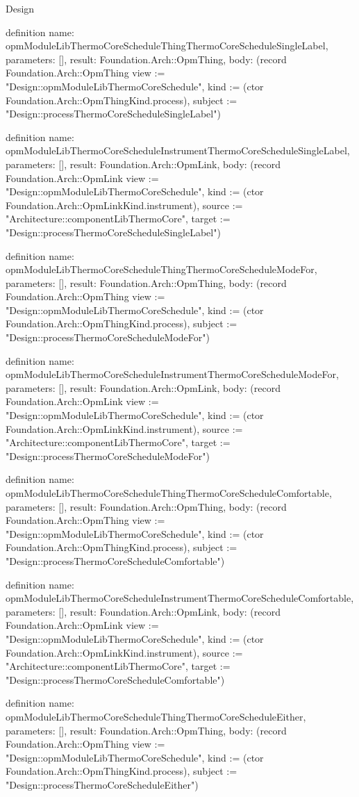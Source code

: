 \begin{lexlean}{Design}
\begin{semanticmodule}
definition{
  name: opmModuleLibThermoCoreScheduleThingThermoCoreScheduleSingleLabel,
  parameters: [],
  result: Foundation.Arch::OpmThing,
  body: (record Foundation.Arch::OpmThing {view := "Design::opmModuleLibThermoCoreSchedule", kind := (ctor Foundation.Arch::OpmThingKind.process), subject := "Design::processThermoCoreScheduleSingleLabel"})
}

definition{
  name: opmModuleLibThermoCoreScheduleInstrumentThermoCoreScheduleSingleLabel,
  parameters: [],
  result: Foundation.Arch::OpmLink,
  body: (record Foundation.Arch::OpmLink {view := "Design::opmModuleLibThermoCoreSchedule", kind := (ctor Foundation.Arch::OpmLinkKind.instrument), source := "Architecture::componentLibThermoCore", target := "Design::processThermoCoreScheduleSingleLabel"})
}

definition{
  name: opmModuleLibThermoCoreScheduleThingThermoCoreScheduleModeFor,
  parameters: [],
  result: Foundation.Arch::OpmThing,
  body: (record Foundation.Arch::OpmThing {view := "Design::opmModuleLibThermoCoreSchedule", kind := (ctor Foundation.Arch::OpmThingKind.process), subject := "Design::processThermoCoreScheduleModeFor"})
}

definition{
  name: opmModuleLibThermoCoreScheduleInstrumentThermoCoreScheduleModeFor,
  parameters: [],
  result: Foundation.Arch::OpmLink,
  body: (record Foundation.Arch::OpmLink {view := "Design::opmModuleLibThermoCoreSchedule", kind := (ctor Foundation.Arch::OpmLinkKind.instrument), source := "Architecture::componentLibThermoCore", target := "Design::processThermoCoreScheduleModeFor"})
}

definition{
  name: opmModuleLibThermoCoreScheduleThingThermoCoreScheduleComfortable,
  parameters: [],
  result: Foundation.Arch::OpmThing,
  body: (record Foundation.Arch::OpmThing {view := "Design::opmModuleLibThermoCoreSchedule", kind := (ctor Foundation.Arch::OpmThingKind.process), subject := "Design::processThermoCoreScheduleComfortable"})
}

definition{
  name: opmModuleLibThermoCoreScheduleInstrumentThermoCoreScheduleComfortable,
  parameters: [],
  result: Foundation.Arch::OpmLink,
  body: (record Foundation.Arch::OpmLink {view := "Design::opmModuleLibThermoCoreSchedule", kind := (ctor Foundation.Arch::OpmLinkKind.instrument), source := "Architecture::componentLibThermoCore", target := "Design::processThermoCoreScheduleComfortable"})
}

definition{
  name: opmModuleLibThermoCoreScheduleThingThermoCoreScheduleEither,
  parameters: [],
  result: Foundation.Arch::OpmThing,
  body: (record Foundation.Arch::OpmThing {view := "Design::opmModuleLibThermoCoreSchedule", kind := (ctor Foundation.Arch::OpmThingKind.process), subject := "Design::processThermoCoreScheduleEither"})
}


\end{semanticmodule}
\end{lexlean}
